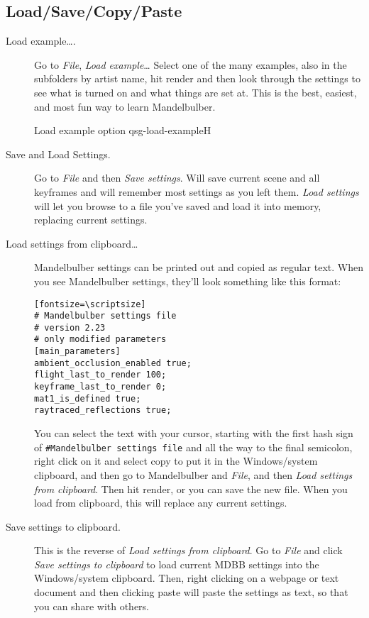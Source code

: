 \subsection{Load/Save/Copy/Paste}\label{qsg-load-save}

\begin{description}
	\item[Load example….] Go to \emph{File}, \emph{Load example}… Select one of the many examples, also in the subfolders by artist name, hit render and then look through the settings to see what is turned on and what things are set at. This is the best, easiest, and most fun way to learn Mandelbulber. 

	{Load example option}
	{qsg-load-example}{H}

	\item[Save and Load Settings.] Go to \emph{File} and then \emph{Save settings}. Will save current scene and all keyframes and will remember most settings as you left them. \emph{Load settings} will let you browse to a file you’ve saved and load it into memory, replacing current settings. 

	\item[Load settings from clipboard…] Mandelbulber settings can be printed out and copied as regular text. When you see Mandelbulber settings, they’ll look something like this format:
	
	\begin{verbatim}[fontsize=\scriptsize]
# Mandelbulber settings file
# version 2.23
# only modified parameters
[main_parameters]
ambient_occlusion_enabled true;
flight_last_to_render 100;
keyframe_last_to_render 0;
mat1_is_defined true;
raytraced_reflections true; 
	\end{verbatim}

	You can select the text with your cursor, starting with the first hash sign of \texttt{\#Mandelbulber settings file} and all the way to the final semicolon, right click on it and select copy to put it in the Windows/system clipboard, and then go to Mandelbulber and \emph{File}, and then \emph{Load settings from clipboard}. Then hit render, or you can save the new file. When you load from clipboard, this will replace any current settings. 

    \item[Save settings to clipboard.] This is the reverse of \emph{Load settings from clipboard}. Go to \emph{File} and click \emph{Save settings to clipboard} to load current MDBB settings into the Windows/system clipboard. Then, right clicking on a webpage or text document and then clicking paste will paste the settings as text, so that you can share with others. 
        
\end{description}

